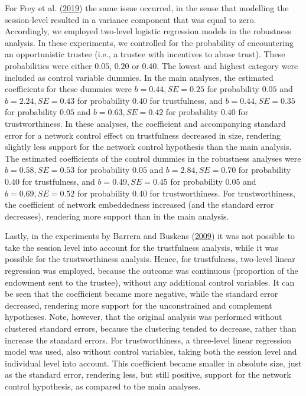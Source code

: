 \documentclass[
  11pt,
]{article}
\begin{document}
For Frey et al. (\protect\hyperlink{ref-frey_buskens_investments_2019}{2019}) the same issue occurred, in the sense that modelling the session-level resulted in a variance component that was equal to zero.
Accordingly, we employed two-level logistic regression models in the robustness analysis.
In these experiments, we controlled for the probability of encountering an opportunistic trustee (i.e., a trustee with incentives to abuse trust).
These probabilities were either \(0.05\), \(0.20\) or \(0.40\). The lowest and highest category were included as control variable dummies.
In the main analyses, the estimated coefficients for these dummies were \(b = 0.44, SE = 0.25\) for probability \(0.05\) and \(b = 2.24, SE = 0.43\) for probability \(0.40\) for trustfulness, and \(b = 0.44, SE = 0.35\) for probability \(0.05\) and \(b = 0.63, SE = 0.42\) for probability \(0.40\) for trustworthiness.
In these analyses, the coefficient and accompanying standard error for a network control effect on trustfulness decreased in size, rendering slightly less support for the network control hypothesis than the main analysis.
The estimated coefficients of the control dummies in the robustness analyses were \(b = 0.58, SE = 0.53\) for probability \(0.05\) and \(b = 2.84, SE = 0.70\) for probability \(0.40\) for trustfulness, and \(b = 0.49, SE = 0.45\) for probability \(0.05\) and \(b = 0.69, SE = 0.52\) for probability \(0.40\) for trustworthiness.
For trustworthiness, the coefficient of network embeddedness increased (and the standard error decreases), rendering more support than in the main analysis.

Lastly, in the experiments by Barrera and Buskens (\protect\hyperlink{ref-barrera_buskens_third_2009}{2009}) it was not possible to take the session level into account for the trustfulness analysis, while it was possible for the trustworthiness analysis.
Hence, for trustfulness, two-level linear regression was employed, because the outcome was continuous (proportion of the endowment sent to the trustee), without any additional control variables.
It can be seen that the coefficient became more negative, while the standard error decreased, rendering more support for the unconstrained and complement hypotheses.
Note, however, that the original analysis was performed without clustered standard errors, because the clustering tended to decrease, rather than increase the standard errors.
For trustworthiness, a three-level linear regression model was used, also without control variables, taking both the session level and individual level into account.
This coefficient became smaller in absolute size, just as the standard error, rendering less, but still positive, support for the network control hypothesis, as compared to the main analyses.
\end{document}
